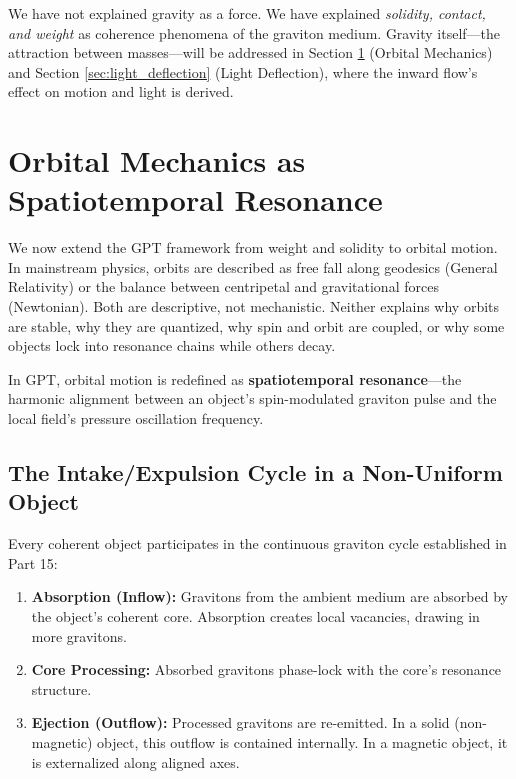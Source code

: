 \documentclass[12pt, a4paper]{article}
\begin{document}
We have not explained gravity as a force. We have explained \textit{solidity, contact, and weight} as coherence phenomena of the graviton medium. Gravity itself—the attraction between masses—will be addressed in Section \ref{sec:orbital_mechanics} (Orbital Mechanics) and Section \ref{sec:light_deflection} (Light Deflection), where the inward flow's effect on motion and light is derived.
\section{Orbital Mechanics as Spatiotemporal Resonance}
\label{sec:orbital_mechanics}

We now extend the GPT framework from weight and solidity to orbital motion. In mainstream physics, orbits are described as free fall along geodesics (General Relativity) or the balance between centripetal and gravitational forces (Newtonian). Both are descriptive, not mechanistic. Neither explains why orbits are stable, why they are quantized, why spin and orbit are coupled, or why some objects lock into resonance chains while others decay.

In GPT, orbital motion is redefined as \textbf{spatiotemporal resonance}—the harmonic alignment between an object's spin-modulated graviton pulse and the local field's pressure oscillation frequency.

\subsection{The Intake/Expulsion Cycle in a Non-Uniform Object}
\label{subsec:intake_expulsion}

Every coherent object participates in the continuous graviton cycle established in Part 15:

\begin{enumerate}
    \item \textbf{Absorption (Inflow):} Gravitons from the ambient medium are absorbed by the object's coherent core. Absorption creates local vacancies, drawing in more gravitons.
    \item \textbf{Core Processing:} Absorbed gravitons phase-lock with the core's resonance structure.
    \item \textbf{Ejection (Outflow):} Processed gravitons are re-emitted. In a solid (non-magnetic) object, this outflow is contained internally. In a magnetic object, it is externalized along aligned axes.
\end{enumerate}
\end{document}
